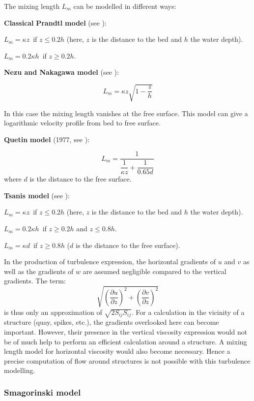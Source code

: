 The mixing length $L_{m}$ can be modelled in different ways:

\textbf{Classical} \textbf{Prandtl} \textbf{model} (see \cite{rodi84}):

$L_{m}=\kappa z$\ if $z\leq0.2h$ (here, $z$ is the distance to the bed and
$h$ the water depth).

$L_{m}=0.2\kappa h$\ if $z\geq0.2h$.

\textbf{Nezu and Nakagawa model} (see \cite{nezu93}):%

\[
L_{m}=\kappa z\sqrt{1-\dfrac{z}{h}}%
\]


In this case the mixing length vanishes at the free surface. This model can
give a logarithmic velocity profile from bed to free surface.

\textbf{Quetin} \textbf{model} (1977, see \cite{quetin77}):%
%
%

\[
L_{m}=\dfrac{1}{\dfrac{1}{\kappa z}+\dfrac{1}{0.65d}}%
\]
where $d$ is the distance to the free surface.

\textbf{Tsanis model} (see \cite{tsanis89}):%
%


$L_{m}=\kappa z$\ if $z\leq0.2h$ (here, $z$ is the distance to the bed and
$h$ the water depth).

$L_{m}=0.2\kappa h$\ if $z\geq0.2h$ and $z\leq0.8h$.

$L_{m}=\kappa d$\ if $z\geq0.8h$ ($d$ is the distance to the free surface).

In the production of turbulence expression, the horizontal gradients of $u$
and $v$ as well as the gradients of $w$ are assumed negligible compared to the
vertical gradients. The term:
\[
\sqrt{\left(  \dfrac{\partial u}{\partial z}\right)  ^{2}+\left(
    \dfrac{\partial v}{\partial z}\right)  ^{2}}%
\]
is thus only an approximation of $\sqrt{2S_{ij}S_{ij}}$. For a calculation in
the vicinity of a structure (quay, spikes, etc.), the gradients overlooked
here can become important. However, their presence in the vertical viscosity
expression would not be of much help to perform an efficient calculation
around a structure. A mixing length model for horizontal viscosity would also
become necessary. Hence a precise computation of flow around structures is not
possible with this turbulence modelling.%



\subsubsection{\label{smagorinski}Smagorinski model%
}

